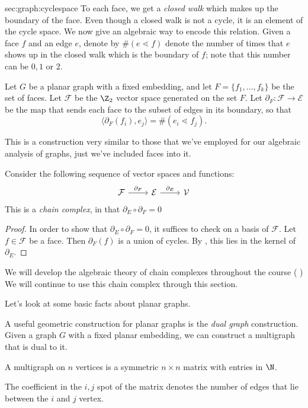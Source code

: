 \begin{stationconnection}{sec:graph:cyclespace}
 To each face, we get a \emph{closed walk} which makes up the boundary of the face. Even though a closed walk is not a cycle, it is an element of the cycle space. We now give an algebraic way to encode this relation. Given a face $f$ and an edge $e$, denote by $\#(e\lessdot f)$ denote the number of times that $e$ shows up in the closed walk which is the boundary of $f$; note that this number can be $0, 1$ or $2$.
\begin{definition} Let $G$ be a planar graph with a fixed embedding, and let $F=\{f_1, \ldots, f_k\}$ be the set of faces. Let $\mathcal F$ be the $\Z_2$ vector space generated on the set $F$. Let $\partial_F: \mathcal F\to \mathcal E$ be the map that sends each face to the subset of edges in its boundary, so that 
  \[\langle \partial_F(f_i), e_j\rangle = \#(e_i\lessdot f_j).\]  
 \end{definition}
This is a construction very similar to those that we've employed for our algebraic analysis of graphs, just we've included faces into it. 
\begin{claim}
Consider the following sequence of vector spaces and functions:
\[ \begin{tikzcd}
\mathcal F \arrow{r}{\partial_F} & \mathcal E \arrow{r}{\partial_E} & \mathcal V
\end{tikzcd}\]
This is a \emph{chain complex}, in that $\partial_E\circ \partial_F =0$ \label{def:planarcomplex}
\label{claim:dsquarezerograph}
\end{claim}
\begin{proof}
In order to show that $\partial_E\circ \partial_F=0$, it suffices to check on a basis of $\mathcal F$. Let $f\in \mathcal F$ be a face. Then $\partial_F(f)$ is a union of cycles. By , this lies in the kernel of $\partial_E$. 
\end{proof}
We will develop the algebraic theory of chain complexes throughout the course ( )
We will continue to use this chain complex through this section.
\end{stationconnection}


Let's look at some basic facts about planar graphs.

A useful geometric construction for planar graphs is the \emph{dual graph} construction. Given a graph $G$ with a fixed planar embedding, we can construct a multigraph that is dual to it. 
\begin{definition}[Multigraph]
 A multigraph on $n$ vertices is a symmetric $n\times n$ matrix with entries in $\N$. 
\end{definition}
The coefficient in the $i,j$ spot of the matrix denotes the number of edges that lie between the $i$ and $j$ vertex. 


